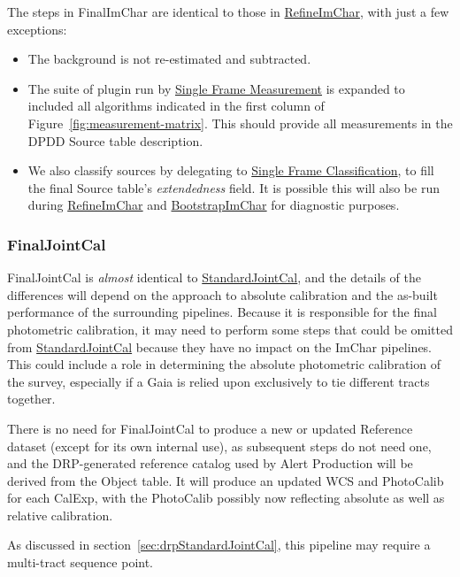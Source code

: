 The steps in FinalImChar are identical to those in \hyperref[sec:drpRefineImChar]{RefineImChar}, with just a few exceptions:

\begin{itemize}
\item The background is not re-estimated and subtracted.
\item The suite of plugin run by \hyperref[sec:acSingleFrameMeasurement]{Single Frame Measurement} is expanded to included all algorithms indicated in the first column of Figure~\ref{fig:measurement-matrix}.  This should provide all measurements in the DPDD Source table description.
\item We also classify sources by delegating to \hyperref[sec:acSingleFrameClassification]{Single Frame Classification}, to fill the final Source table's \emph{extendedness} field.  It is possible this will also be run during \hyperref[sec:drpRefineImChar]{RefineImChar} and \hyperref[sec:drpBootstrapImChar]{BootstrapImChar} for diagnostic purposes.
\end{itemize}

\subsubsection{FinalJointCal}
\label{sec:drpFinalJointCal}

FinalJointCal is \emph{almost} identical to \hyperref[sec:drpStandardJointCal]{StandardJointCal}, and the details of the differences will depend on the approach to absolute calibration and the as-built performance of the surrounding pipelines.  Because it is responsible for the final photometric calibration, it may need to perform some steps that could be omitted from \hyperref[sec:drpStandardJointCal]{StandardJointCal} because they have no impact on the ImChar pipelines.  This could include a role in determining the absolute photometric calibration of the survey, especially if a Gaia is relied upon exclusively to tie different tracts together.

There is no need for FinalJointCal to produce a new or updated Reference dataset (except for its own internal use), as subsequent steps do not need one, and the DRP-generated reference catalog used by Alert Production will be derived from the Object table.  It will produce an updated WCS and PhotoCalib for each CalExp, with the PhotoCalib possibly now reflecting absolute as well as relative calibration.

As discussed in section~\ref{sec:drpStandardJointCal}, this pipeline may require a multi-tract sequence point.

